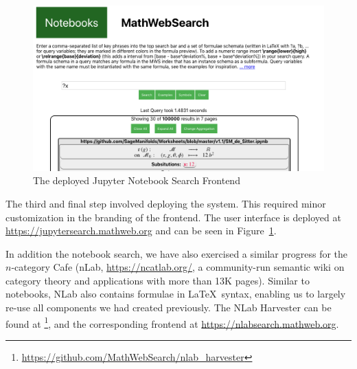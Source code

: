 \begin{figure}[ht]
  \includegraphics[width=\textwidth]{mwsnotebookfront.png}
  \caption{The deployed Jupyter Notebook Search Frontend}\label{fig:mwsnotebookfront}
\end{figure}

The third and final step involved deploying the system.
This required minor customization in the branding of the frontend. 
The user interface is deployed at \url{https://jupytersearch.mathweb.org} and can be seen in Figure~\ref{fig:mwsnotebookfront}.

In addition the notebook search, we have also exercised a similar progress for the $n$-category Cafe (nLab, \url{https://ncatlab.org/}, a community-run semantic wiki on category theory and applications with more than 13K pages). 
Similar to notebooks, NLab also contains formulae in \LaTeX\ syntax, enabling us to largely re-use all components we had created previously.  The NLab Harvester can be found at \footnote{\url{https://github.com/MathWebSearch/nlab_harvester}}, and the corresponding frontend at \url{https://nlabsearch.mathweb.org}.


